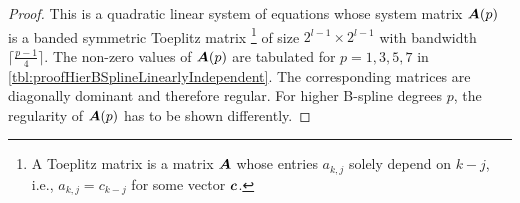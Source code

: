 \begin{proof}
  This is a quadratic linear system of equations
  whose system matrix
  ${\boldsymbol{A}}(p)$ is a banded symmetric Toeplitz matrix%
  \footnote{%
    A Toeplitz matrix is a matrix ${\boldsymbol{A}}$ whose entries $a_{k,j}$
    solely depend on $k - j$, i.e.,
    $a_{k,j} = c_{k-j}$ for some vector ${\boldsymbol{c}}$.%
  }
  of size
  $2^{l-1} \times 2^{l-1}$ with bandwidth $\lceil\tfrac{p-1}{4}\rceil$.
  The non-zero values of ${\boldsymbol{A}}(p)$ are tabulated for $p = 1, 3, 5, 7$
  in \cref{tbl:proofHierBSplineLinearlyIndependent}.
  The corresponding matrices are diagonally dominant and therefore regular.
  For higher B-spline degrees $p$, the regularity of ${\boldsymbol{A}}(p)$ has
  to be shown differently.
  

\end{proof}
